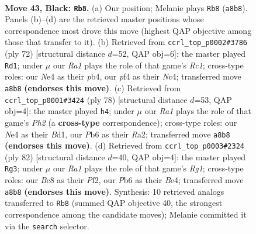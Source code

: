 \documentclass[11pt]{article}
\begin{document}
\clearpage

\begin{figure}[p]\centering
\begin{subfigure}{0.46\textwidth}\centering
\resizebox{\linewidth}{!}{%
\newchessgame
\chessboard[
  setfen={r1b5/p2p2k1/1pp5/5p1p/1PPPnP2/NB6/P3K2P/2R5 b - - 4 43},
  showmover=false,
  pgfstyle=straightmove, color=movearrow, markmove={a8-b8}
]}
\caption{}
\end{subfigure}\hfill
\begin{subfigure}{0.46\textwidth}\centering
\resizebox{\linewidth}{!}{%
\newchessgame
\chessboard[
  setfen={5k2/r1n3p1/5b1p/2p1pP1P/1pN5/6P1/1PB2PK1/2R5 w - - 3 37},
  showmover=false,
  pgfstyle=straightmove, color=movearrow, markmove={c1-d1}
]}
\caption{}
\end{subfigure}
\\[4pt]
\begin{subfigure}{0.46\textwidth}\centering
\resizebox{\linewidth}{!}{%
\newchessgame
\chessboard[
  setfen={1r6/3bk3/7p/1p1p1p2/2pP1P2/2P1P3/R6P/3BK3 w - - 5 40},
  showmover=false,
  pgfstyle=straightmove, color=movearrow, markmove={h2-h4}
]}
\caption{}
\end{subfigure}\hfill
\begin{subfigure}{0.46\textwidth}\centering
\resizebox{\linewidth}{!}{%
\newchessgame
\chessboard[
  setfen={4k3/4b3/1p1rp2p/p3p1p1/4B1P1/P1P4P/1P2KP2/6R1 w - - 5 42},
  showmover=false,
  pgfstyle=straightmove, color=movearrow, markmove={g1-g3}
]}
\caption{}
\end{subfigure}
\caption{\textbf{Move 43, Black: \texttt{Rb8}.} (a) Our position; Melanie plays \texttt{Rb8} (\texttt{a8b8}). Panels (b)--(d) are the retrieved master positions whose correspondence most drove this move (highest QAP objective among those that transfer to it). (b) Retrieved from \texttt{ccrl\_top\_p0002\#3786} (ply 72) [structural distance $d$=52, QAP obj=6]: the master played \texttt{Rd1}; under $\mu$ our \emph{Ra1} plays the role of that game's \emph{Rc1}; cross-type roles: our \emph{N}e4 as their \emph{p}b4, our \emph{p}f4 as their \emph{N}c4; transferred move \texttt{a8b8} \textbf{(endorses this move)}. (c) Retrieved from \texttt{ccrl\_top\_p0001\#3424} (ply 78) [structural distance $d$=53, QAP obj=4]: the master played \texttt{h4}; under $\mu$ our \emph{Ra1} plays the role of that game's \emph{Ph2} (a \textbf{cross-type} correspondence); cross-type roles: our \emph{N}e4 as their \emph{B}d1, our \emph{P}b6 as their \emph{R}a2; transferred move \texttt{a8b8} \textbf{(endorses this move)}. (d) Retrieved from \texttt{ccrl\_top\_p0003\#2324} (ply 82) [structural distance $d$=40, QAP obj=4]: the master played \texttt{Rg3}; under $\mu$ our \emph{Ra1} plays the role of that game's \emph{Rg1}; cross-type roles: our \emph{B}c8 as their \emph{P}f2, our \emph{P}b6 as their \emph{B}e4; transferred move \texttt{a8b8} \textbf{(endorses this move)}. Synthesis: 10 retrieved analogs transferred to \texttt{Rb8} (summed QAP objective 40, the strongest correspondence among the candidate moves); Melanie committed it via the \texttt{search} selector.}
\label{fig:thought-m85}
\end{figure}
\end{document}
